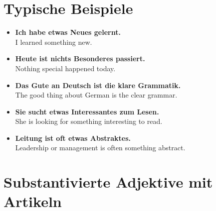 \documentclass[a4paper,11pt]{article}
\newcommand{\ExampleItem}[2]{\item \textbf{#1}\\{\small\color{SoftGray}#2}}
\begin{document}
    
    \section{Typische Beispiele}
        
        \begin{exbox}
            
            \begin{itemize}
                
                \ExampleItem
                {Ich habe etwas Neues gelernt.}
                {I learned something new.}
                
                \ExampleItem
                {Heute ist nichts Besonderes passiert.}
                {Nothing special happened today.}
                
                \ExampleItem
                {Das Gute an Deutsch ist die klare Grammatik.}
                {The good thing about German is the clear grammar.}
                
                \ExampleItem
                {Sie sucht etwas Interessantes zum Lesen.}
                {She is looking for something interesting to read.}
                
                \ExampleItem
                {Leitung ist oft etwas Abstraktes.}
                {Leadership or management is often something abstract.}
            
            \end{itemize}
        
        \end{exbox}
    
    
    \section{Substantivierte Adjektive mit Artikeln}
        
\end{document}
